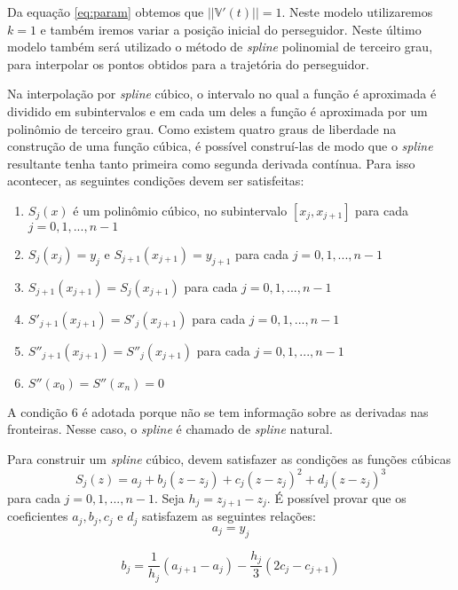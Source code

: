 \documentclass[a4paper,10pt]{article}
\begin{document}
  Da equação \ref{eq:param} obtemos que $||\mathbb{V}'(t)|| = 1$. Neste modelo utilizaremos $k = 1$ e também iremos variar a posição inicial do perseguidor. Neste último modelo também será utilizado o método de \emph{spline} polinomial de terceiro grau, para interpolar os pontos obtidos para a trajetória do perseguidor.  
   
  Na interpolação por \emph{spline} cúbico, o intervalo no qual a função é aproximada é dividido em subintervalos e em cada um deles a função é aproximada por um polinômio de terceiro grau. Como existem quatro graus de liberdade na construção de uma função cúbica, é possível construí-las de modo que o \emph{spline} resultante tenha tanto primeira como segunda derivada contínua.
  Para isso acontecer, as seguintes condições devem ser satisfeitas:
  \begin{enumerate}
  \item $S_j(x)$ é um polinômio cúbico, no subintervalo $[x_j,x_{j+1}]$ para cada $j = 0,1,...,n-1$
  \item $S_j(x_j) = y_j$ e $S_{j+1}(x_{j+1}) = y_{j+1} $ para cada $j = 0,1,...,n-1$
  \item $S_{j+1}(x_{j+1})=S_j(x_{j+1})$ para cada $j = 0,1,...,n-1$
  \item $S'_{j+1}(x_{j+1})=S'_j(x_{j+1})$ para cada $j = 0,1,...,n-1$
  \item $S''_{j+1}(x_{j+1})=S''_j(x_{j+1})$ para cada $j = 0,1,...,n-1$
  \item $S''(x_0) = S''(x_n) = 0$
  \end{enumerate}
  
  A condição 6 é adotada porque não se tem informação sobre as derivadas nas fronteiras. Nesse caso, o \emph{spline} é chamado de \emph{spline} natural.  
  
Para construir um \emph{spline} cúbico, devem satisfazer as condições as funções cúbicas
  \begin{equation}
   S_j(z) = a_j + b_j(z - z_j)+c_j(z-z_j)^2 + d_j(z-z_j)^3
   \label{eq:spline}
  \end{equation}
  para cada $j = 0, 1, ..., n-1$.
  Seja $h_j=z_{j+1}-z_j$.
  É possível provar \cite{burden} que os coeficientes $a_j, b_j, c_j$ e $d_j$ satisfazem as seguintes relações:
  \begin{equation}
   a_j = y_{j}
  \label{eq:coef_a}
  \end{equation}
  
  \begin{equation}
  b_j = \frac{1}{h_j}(a_{j+1} - a_j) - \frac{h_j}{3}(2c_j - c_{j+1})
  \label{eq:coef_b}
  \end{equation}
  
\end{document}
